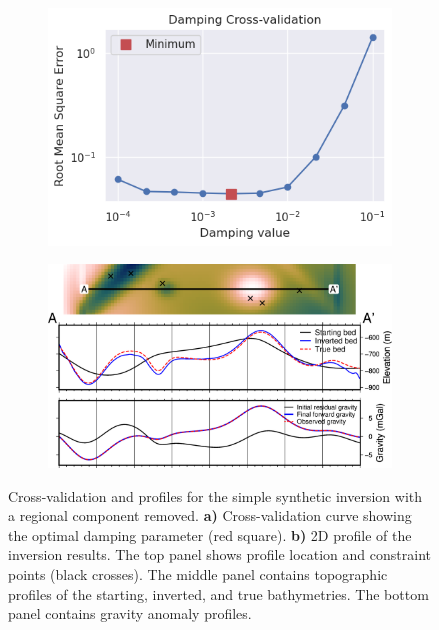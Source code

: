 \begin{figure}[!ht]
  \centering
    \begin{subfigure}[t]{.40\textwidth}
        \centering
        \includegraphics[width=\textwidth]{figures/chp3/chp3_simple_regional_CV.png}
        \caption{}
    \end{subfigure}
    \begin{subfigure}[t]{.58\textwidth}
        \centering
        \includegraphics[width=\textwidth]{figures/chp3/chp3_simple_regional_profile.png}
        \caption{}
    \end{subfigure}
  \caption[Synthetic inversion with regional component, CV and profile]{Cross-validation and profiles for the simple synthetic inversion with a regional component removed. \textbf{a)} Cross-validation curve showing the optimal damping parameter (red square). \textbf{b)} 2D profile of the inversion results. The top panel shows profile location and constraint points (black crosses). The middle panel contains topographic profiles of the starting, inverted, and true bathymetries. The bottom panel contains gravity anomaly profiles.}
    \label{fig:chp3_simple_regional_CV_and_profile}
\end{figure}


